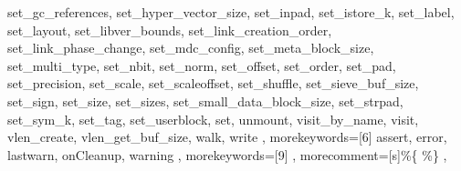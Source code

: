 {{        set_gc_references,%
        set_hyper_vector_size,%
        set_inpad,%
        set_istore_k,%
        set_label,%
        set_layout,%
        set_libver_bounds,%
        set_link_creation_order,%
        set_link_phase_change,%
        set_mdc_config,%
        set_meta_block_size,%
        set_multi_type,%
        set_nbit,%
        set_norm,%
        set_offset,%
        set_order,%
        set_pad,%
        set_precision,%
        set_scale,%
        set_scaleoffset,%
        set_shuffle,%
        set_sieve_buf_size,%
        set_sign,%
        set_size,%
        set_sizes,%
        set_small_data_block_size,%
        set_strpad,%
        set_sym_k,%
        set_tag,%
        set_userblock,%
        set,%
        unmount,%
        visit_by_name,%
        visit,%
        vlen_create,%
        vlen_get_buf_size,%
        walk,%
        write%
    },
    morekeywords=[6]{%
        assert,
        error,%
        lastwarn,
        onCleanup,
        warning%
    },
    morekeywords=[9]{%
    },
    morecomment=[s]{\%\{ }{\%\} },%
}
